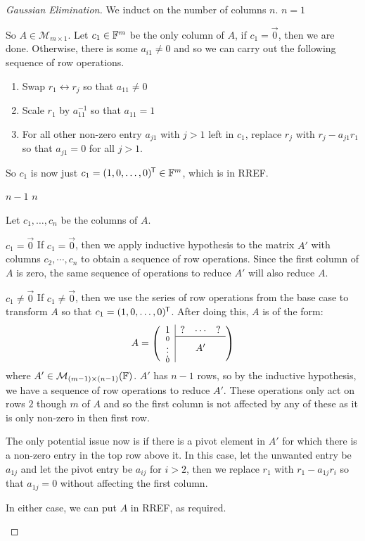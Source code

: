 \documentclass[../main.tex]{subfiles}
\begin{document}
\begin{proof}[Gaussian Elimination]
  We induct on the number of columns $n$.
  \quietinduction
  {$n = 1$}{
    So $A \in \mathcal{M}_{m \times 1}$.
    Let $c_1 \in \mathbb{F}^m$ be the only column of $A$, if $c_1 = \vec{0}$, then we are done.
    Otherwise, there is some $a_{i 1} \neq 0$ and so we can carry out the following sequence of row operations.
    \begin{enumerate}
      \item Swap $r_1 \leftrightarrow r_j$ so that $a_{1 1} \neq 0$
      \item Scale $r_1$ by $a^{-1}_{1 1}$ so that $a_{1 1} = 1$
      \item For all other non-zero entry $a_{j 1}$ with $j > 1$ left in $c_1$, replace $r_j$ with $r_j - a_{j 1} r_1$ so that $a_{j 1} = 0$ for all $j > 1$.
    \end{enumerate}
    So $c_1$ is now just $c_1 = (1, 0, \ldots, 0)^{{\mkern-1.5mu\mathsf{T}}} \in \mathbb{F}^m$, which is in RREF.
  }
  {$n - 1$}{}
  {$n$}{
    Let $c_1, \ldots, c_n$ be the columns of $A$.

    \begin{proofcases}
      \begin{case}{$c_1 = \vec{0}$}
        If $c_1 = \vec{0}$, then we apply inductive hypothesis to the matrix $A'$ with columns $c_2, \cdots, c_n$ to obtain a sequence of row operations.
        Since the first column of $A$ is zero, the same sequence of operations to reduce $A'$ will also reduce $A$.
      \end{case}
      \begin{case}{$c_1 \neq \vec{0}$}
        If $c_1 \neq \vec{0}$, then we use the series of row operations from the base case to transform $A$ so that $c_1 = (1, 0, \ldots, 0)^{{\mkern-1.5mu\mathsf{T}}}$.
        After doing this, $A$ is of the form:
        \[
          A = \left(\begin{array}{c c c c}
              \multicolumn{1}{c|}{1} & ? & \cdots & ? \\ \cline{2-4}
              \multicolumn{1}{c|}{\scriptstyle{\substack{0 \\ \vdots \\ 0}}} & \multicolumn{3}{c}{A'} \\
              \end{array}\right)
        \]
        where $A' \in \mathcal{M}_{(m - 1) \times (n - 1)}(\mathbb{F})$.
        $A'$ has $n - 1$ rows, so by the inductive hypothesis, we have a sequence of row operations to reduce $A'$.
        These operations only act on rows $2$ though $m$ of $A$ and so the first column is not affected by any of these as it is only non-zero in then first row.

        The only potential issue now is if there is a pivot element in $A'$ for which there is a non-zero entry in the top row above it.
        In this case, let the unwanted entry be $a_{1 j}$ and let the pivot entry be $a_{i j}$ for $i > 2$, then we replace $r_1$ with $r_1 - a_{1 j} r_i$ so that $a_{1 j} = 0$ without affecting the first column.
      \end{case}
      In either case, we can put $A$ in RREF, as required.
    \end{proofcases}
  }
\end{proof}
\end{document}
